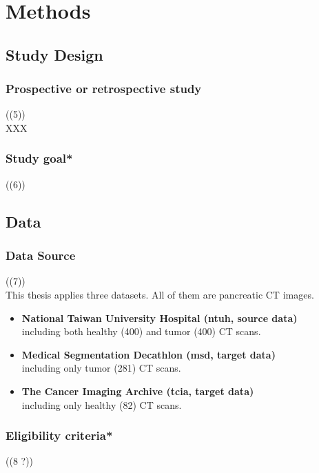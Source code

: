 \chapter{Methods}
 
\section{Study Design}
\subsection{Prospective or retrospective study}
((5)) \\
XXX 

\subsection{Study goal*}
((6)) \\
\section{Data}
\subsection{Data Source}
((7)) \\
This thesis applies three datasets. All of them are pancreatic CT images.
\begin{itemize}
    \item {\bf National Taiwan University Hospital (ntuh, source data)} \\including both healthy (400) and tumor (400) CT scans. 
    \item {\bf Medical Segmentation Decathlon\cite{simpson2019large} (msd, target data)}\\ including only tumor (281) CT scans. 
    \item {\bf The Cancer Imaging Archive (tcia, target data)}\\ including only healthy (82) CT scans. 
\end{itemize}

\subsection{Eligibility criteria*}
((8 ?)) \\

